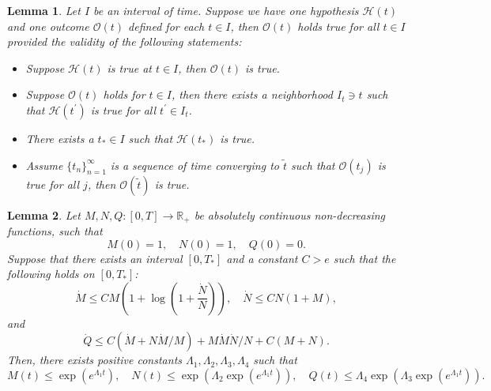 \documentclass[10pt,a4paper]{amsart}
\newtheorem{lem}{Lemma}
\begin{document}
\begin{lem}\label{Bootstrap Lemma}
    Let $I$ be an interval of time. Suppose we have one hypothesis $\mathscr H(t)$ and one outcome $\mathscr O(t)$ defined for each $t\in I$, then $\mathscr O(t)$ holds true for all $t\in I$ provided the validity of the following statements:
    \begin{itemize}
        \item [(I)] Suppose $\mathscr H(t)$ is true at $t\in I$, then $\mathscr O(t)$ is true.

        \item [(II)] Suppose $\mathscr O(t)$ holds for $t\in I$, then there exists a neighborhood $I_t\owns t$ such that $\mathscr H(t^\prime)$ is true for all $t^\prime\in I_t$.

        \item [(III)] There exists a $t_*\in I$ such that $\mathscr H(t_*)$ is true.

        \item [(IV)] Assume $\{t_n\}_{n=1}^\infty$ is a sequence of time converging to $\tilde t$ such that $\mathscr O(t_j)$ is true for all $j$, then $\mathscr O(\tilde t)$ is true.
    \end{itemize}
\end{lem}

\begin{lem}\label{Hierarchical Growth of Norms for Bou and IIE}
  Let $M,N,Q: [0,T]\to \mathbb R_+$ be absolutely continuous non-decreasing functions, such that
  \begin{equation*}
  M(0)=1, \quad N(0)=1,\quad Q(0)=0.    
  \end{equation*}
  Suppose that there exists an interval $[0,T_*]$ and a constant $C>e$ such that the following holds on $[0,T_*]$:
  \begin{equation}\label{Differential inequality of MYZ}
   \dot M\le CM(1+\log(1+\frac{\dot N}{N})),\quad \dot N\le CN(1+M),  
  \end{equation}
  and
  \begin{equation}\label{Differential inequality of Duhamel Term}
    \dot Q\le C(\dot M+N\dot M/M)+M\dot M\dot N/N +C(M+N). 
  \end{equation}
  Then, there exists positive constants $\Lambda_1,\Lambda_2,\Lambda_3,\Lambda_4$ such that
  \begin{equation}\label{Growth of controlling norms}
  M(t)\le \exp(e^{\Lambda_1 t}),\quad N(t)\le \exp(\Lambda_2\exp(e^{\Lambda_1t})),\quad Q(t)\le \Lambda_4 \exp(\Lambda_3\exp( e^{\Lambda_1t})) .  
  \end{equation}
  
\end{lem}
\end{document}
